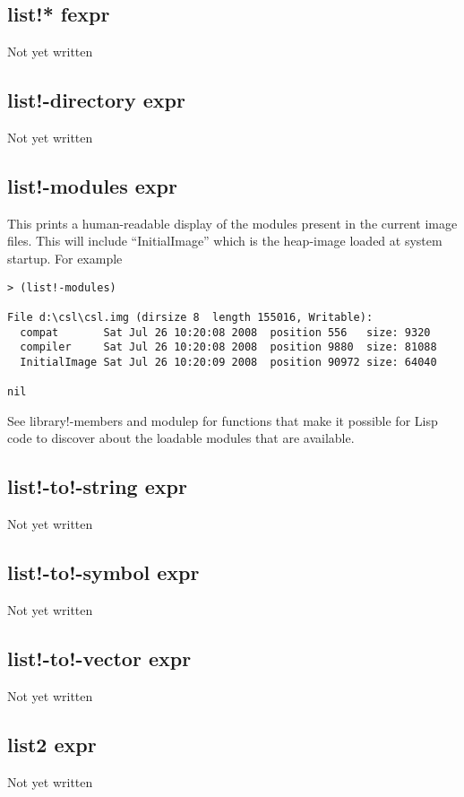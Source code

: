 \documentclass[a4paper,11pt]{article}
\begin{document}
{\subsection{\ttfamily list!* fexpr}
Not yet written

\subsection{\ttfamily list!-directory expr}
Not yet written
  

\subsection{\ttfamily list!-modules expr}
This prints a human-readable display of the modules present in the current
image files. This will include ``InitialImage'' which is the heap-image
loaded at system startup. For example
\begin{verbatim}
> (list!-modules)
  
File d:\csl\csl.img (dirsize 8  length 155016, Writable):
  compat       Sat Jul 26 10:20:08 2008  position 556   size: 9320
  compiler     Sat Jul 26 10:20:08 2008  position 9880  size: 81088
  InitialImage Sat Jul 26 10:20:09 2008  position 90972 size: 64040
  
nil
\end{verbatim}
  
See {\ttfamily library!-members} and {\ttfamily modulep} for functions that
make it possible for Lisp code to discover about the loadable modules that are
available.

\subsection{\ttfamily list!-to!-string expr}
Not yet written

\subsection{\ttfamily list!-to!-symbol expr}
Not yet written

\subsection{\ttfamily list!-to!-vector expr}
Not yet written

\subsection{\ttfamily list2 expr}
Not yet written

}
\end{document}
